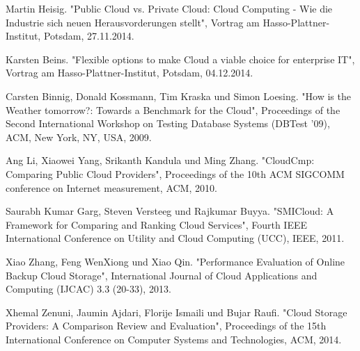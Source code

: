 \ifCLASSOPTIONcaptionsoff
  \newpage
\fi

\begin{thebibliography}{1}
  
Martin Heisig. "Public Cloud vs. Private Cloud: Cloud Computing - Wie die Industrie sich neuen Herausvorderungen stellt", Vortrag am Hasso-Plattner-Institut, Potsdam, 27.11.2014.

Karsten Beins. "Flexible options to make Cloud a viable choice for enterprise IT", Vortrag am Hasso-Plattner-Institut, Potsdam, 04.12.2014.

Carsten Binnig, Donald Kossmann, Tim Kraska und Simon Loesing. "How is the Weather tomorrow?: Towards a Benchmark for the Cloud", Proceedings of the Second International Workshop on Testing Database Systems (DBTest '09), ACM, New York, NY, USA, 2009.

Ang Li, Xiaowei Yang, Srikanth Kandula und Ming Zhang. "CloudCmp: Comparing Public Cloud Providers", Proceedings of the 10th ACM SIGCOMM conference on Internet measurement, ACM, 2010.

Saurabh Kumar Garg, Steven Versteeg und Rajkumar Buyya. "SMICloud: A Framework for Comparing and Ranking Cloud Services", Fourth IEEE International Conference on Utility and Cloud Computing (UCC), IEEE, 2011.

Xiao Zhang, Feng WenXiong und Xiao Qin. "Performance Evaluation of Online Backup Cloud Storage", International Journal of Cloud Applications and Computing (IJCAC) 3.3 (20-33), 2013.

Xhemal Zenuni, Jaumin Ajdari, Florije Ismaili und Bujar Raufi. "Cloud Storage Providers: A Comparison Review and Evaluation", Proceedings of the 15th International Conference on Computer Systems and Technologies, ACM, 2014.

\end{thebibliography}